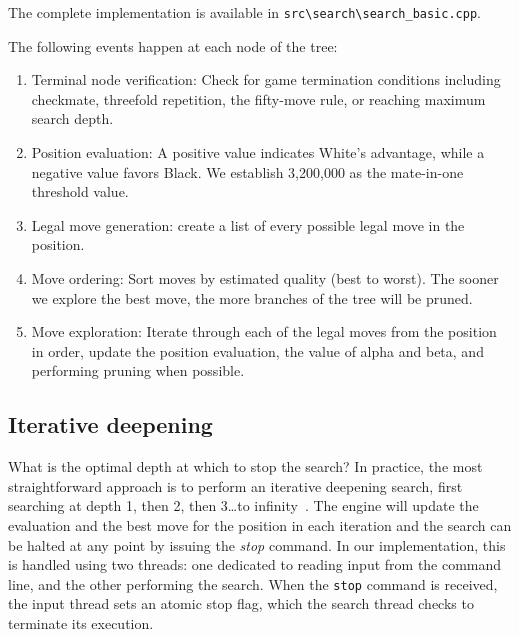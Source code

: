 \vspace{1em}

\noindent \parbox{\textwidth}{The complete implementation is available in \texttt{src\textbackslash{}search\textbackslash{}search\_basic.cpp}.}

\vspace{1em}

\noindent The following events happen at each node of the tree:

\begin{enumerate}
    \item Terminal node verification: Check for game termination conditions including checkmate, threefold repetition, the fifty-move rule, or reaching maximum search depth.
    \item Position evaluation: A positive value indicates White's advantage, while a negative value favors Black. We establish 3,200,000 as the mate-in-one threshold value.
    \item Legal move generation: create a list of every possible legal move in the position.
    \item Move ordering: Sort moves by estimated quality (best to worst). The sooner we explore the best move, the more branches of the tree will be pruned.
    \item Move exploration: Iterate through each of the legal moves from the position in order, update the position evaluation, the value of alpha and beta, and performing pruning when possible.
\end{enumerate}

\subsection*{Iterative deepening}\label{sec:iterativeDeepening}

What is the optimal depth at which to stop the search? In practice, the most straightforward approach is to perform an iterative deepening search, first searching at depth 1, then 2, then 3\ldots to infinity~\cite{IterativeDeepening}. The engine will update the evaluation and the best move for the position in each iteration and the search can be halted at any point by issuing the \textit{stop} command. In our implementation, this is handled using two threads: one dedicated to reading input from the command line, and the other performing the search. When the \texttt{stop} command is received, the input thread sets an atomic stop flag, which the search thread checks to terminate its execution.

